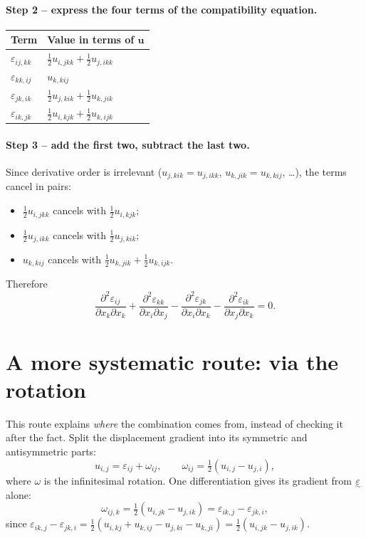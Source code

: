 \documentclass[11pt,a4paper]{article}
\newcommand{\eps}{\varepsilon}
\newcommand{\teps}{\underset{\sim}{\varepsilon}}
\begin{document}
\paragraph{Step 2 -- express the four terms of the compatibility equation.}
\begin{center}
\begin{tabular}{@{}ll@{}}
\toprule
Term & Value in terms of $\boldsymbol u$\\
\midrule
$\eps_{ij,kk}$ & $\tfrac12 u_{i,jkk}+\tfrac12 u_{j,ikk}$\\[2pt]
$\eps_{kk,ij}$ & $u_{k,kij}$\\[2pt]
$\eps_{jk,ik}$ & $\tfrac12 u_{j,kik}+\tfrac12 u_{k,jik}$\\[2pt]
$\eps_{ik,jk}$ & $\tfrac12 u_{i,kjk}+\tfrac12 u_{k,ijk}$\\
\bottomrule
\end{tabular}
\end{center}

\paragraph{Step 3 -- add the first two, subtract the last two.}
Since derivative order is irrelevant ($u_{j,kik}=u_{j,ikk}$, $u_{k,jik}=u_{k,kij}$, \dots), the terms cancel in pairs:
\begin{itemize}
  \item $\tfrac12 u_{i,jkk}$ cancels with $\tfrac12 u_{i,kjk}$;
  \item $\tfrac12 u_{j,ikk}$ cancels with $\tfrac12 u_{j,kik}$;
  \item $u_{k,kij}$ cancels with $\tfrac12 u_{k,jik}+\tfrac12 u_{k,ijk}$.
\end{itemize}
Therefore
\[
  \boxed{\;\frac{\partial^2\eps_{ij}}{\partial x_k\partial x_k}+\frac{\partial^2\eps_{kk}}{\partial x_i\partial x_j}
  -\frac{\partial^2\eps_{jk}}{\partial x_i\partial x_k}-\frac{\partial^2\eps_{ik}}{\partial x_j\partial x_k}=0.\;}
\]

\section{A more systematic route: via the rotation}

This route explains \emph{where} the combination comes from, instead of checking it after the fact.
Split the displacement gradient into its symmetric and antisymmetric parts:
\[
  u_{i,j}=\eps_{ij}+\omega_{ij},\qquad \omega_{ij}=\tfrac12\left(u_{i,j}-u_{j,i}\right),
\]
where $\omega$ is the infinitesimal rotation. One differentiation gives its gradient from $\teps$ alone:
\[
  \omega_{ij,k}=\tfrac12\left(u_{i,jk}-u_{j,ik}\right)=\eps_{ik,j}-\eps_{jk,i},
\]
since $\eps_{ik,j}-\eps_{jk,i}=\tfrac12\left(u_{i,kj}+u_{k,ij}-u_{j,ki}-u_{k,ji}\right)=\tfrac12\left(u_{i,jk}-u_{j,ik}\right)$.
\end{document}
